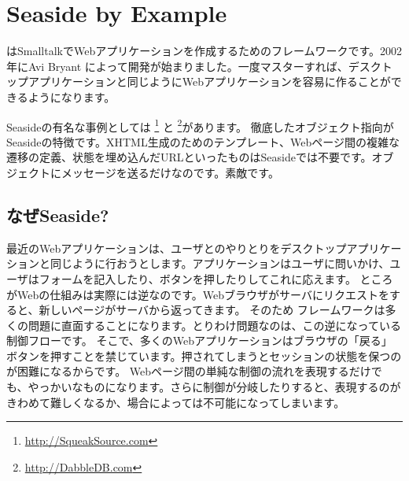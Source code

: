 \documentclass[a4paper,10pt,twoside]{book}
\begin{document}
	\sloppy
\fi
\chapter{Seaside by Example}


 はSmalltalkでWebアプリケーションを作成するためのフレームワークです。2002年にAvi Bryant  によって開発が始まりました。一度マスターすれば、デスクトップアプリケーションと同じようにWebアプリケーションを容易に作ることができるようになります。

Seasideの有名な事例としては \footnote{\url{http://SqueakSource.com}} と \footnote{\url{http://DabbleDB.com}}があります。
徹底したオブジェクト指向がSeasideの特徴です。XHTML生成のためのテンプレート、Webページ間の複雑な遷移の定義、状態を埋め込んだURLといったものはSeasideでは不要です。オブジェクトにメッセージを送るだけなのです。素敵です。

\section{なぜSeaside?}

最近のWebアプリケーションは、ユーザとのやりとりをデスクトップアプリケーションと同じように行おうとします。アプリケーションはユーザに問いかけ、ユーザはフォームを記入したり、ボタンを押したりしてこれに応えます。
ところがWebの仕組みは実際には逆なのです。Webブラウザがサーバにリクエストをすると、新しいページがサーバから返ってきます。
そのため フレームワークは多くの問題に直面することになります。とりわけ問題なのは、この逆になっている制御フローです。
そこで、多くのWebアプリケーションはブラウザの「戻る」ボタンを押すことを禁じています。押されてしまうとセッションの状態を保つのが困難になるからです。
Webページ間の単純な制御の流れを表現するだけでも、やっかいなものになります。さらに制御が分岐したりすると、表現するのがきわめて難しくなるか、場合によっては不可能になってしまいます。

\end{document}
